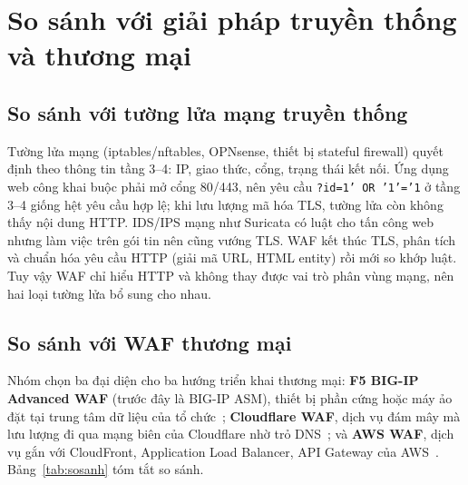\chapter{So sánh với giải pháp truyền thống và thương mại}\label{chap:sosanh}

\section{So sánh với tường lửa mạng truyền thống}
Tường lửa mạng (iptables/nftables, OPNsense, thiết bị stateful firewall) quyết định theo thông tin tầng 3--4: IP, giao thức, cổng, trạng thái kết nối. Ứng dụng web công khai buộc phải mở cổng 80/443, nên yêu cầu \texttt{?id=1' OR '1'='1} ở tầng 3--4 giống hệt yêu cầu hợp lệ; khi lưu lượng mã hóa TLS, tường lửa còn không thấy nội dung HTTP. IDS/IPS mạng như Suricata có luật cho tấn công web nhưng làm việc trên gói tin nên cũng vướng TLS. WAF kết thúc TLS, phân tích và chuẩn hóa yêu cầu HTTP (giải mã URL, HTML entity) rồi mới so khớp luật. Tuy vậy WAF chỉ hiểu HTTP và không thay được vai trò phân vùng mạng, nên hai loại tường lửa bổ sung cho nhau.

\section{So sánh với WAF thương mại}
Nhóm chọn ba đại diện cho ba hướng triển khai thương mại: \textbf{F5 BIG-IP Advanced WAF} (trước đây là BIG-IP ASM), thiết bị phần cứng hoặc máy ảo đặt tại trung tâm dữ liệu của tổ chức~\cite{f5waf}; \textbf{Cloudflare WAF}, dịch vụ đám mây mà lưu lượng đi qua mạng biên của Cloudflare nhờ trỏ DNS~\cite{cloudflarewaf}; và \textbf{AWS WAF}, dịch vụ gắn với CloudFront, Application Load Balancer, API Gateway của AWS~\cite{awswaf}. Bảng~\ref{tab:sosanh} tóm tắt so sánh.

